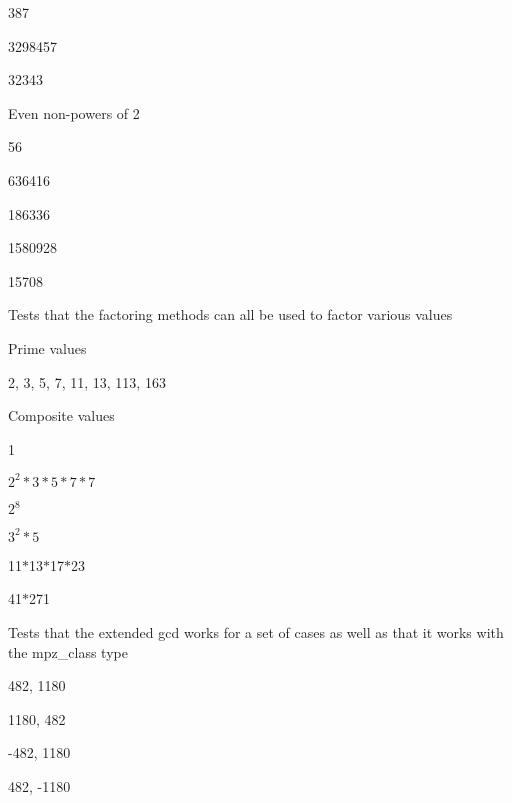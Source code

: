 \begin{DoxyRefList}
\begin{DoxyItemize}
\begin{DoxyItemize}
\item 387
\item 3298457
\item 32343
\end{DoxyItemize}
\item Even non-\/powers of 2
\begin{DoxyItemize}
\item 56
\item 636416
\item 186336
\item 1580928
\item 15708 
\end{DoxyItemize}
\end{DoxyItemize}
\item[\label{test__test000018}%
\hypertarget{test__test000018}{}%
Member \hyperlink{test__factor_8cpp_a4d2d8b352ccc154759d3f76839acb5d7}{T\+E\+S\+T\+\_\+\+C\+A\+SE} (\char`\"{}\+The factoring functions\char`\"{})]Tests that the factoring methods can all be used to factor various values
\begin{DoxyItemize}
\item Prime values
\begin{DoxyItemize}
\item 2, 3, 5, 7, 11, 13, 113, 163
\end{DoxyItemize}
\item Composite values
\begin{DoxyItemize}
\item 1
\item $ 2^2*3*5*7*7 $
\item $ 2^8 $
\item $ 3^2*5 $
\item 11$\ast$13$\ast$17$\ast$23
\item 41$\ast$271 
\end{DoxyItemize}
\end{DoxyItemize}
\item[\label{test__test000017}%
\hypertarget{test__test000017}{}%
Member \hyperlink{test__extgcd_8cpp_a019402ca97e0355cefbe460e947e1999}{T\+E\+S\+T\+\_\+\+C\+A\+SE} (\char`\"{}\+The extended gcd function\char`\"{})]Tests that the extended gcd works for a set of cases as well as that it works with the mpz\+\_\+class type
\begin{DoxyItemize}
\item 482, 1180
\item 1180, 482
\item -\/482, 1180
\item 482, -\/1180

\end{DoxyItemize}
\end{DoxyRefList}
